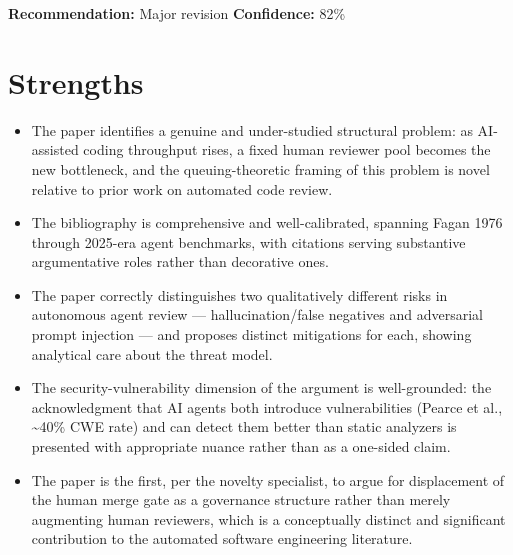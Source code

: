 \documentclass[11pt]{article}
\begin{document}
\textbf{Recommendation:} Major revision \quad \textbf{Confidence:} 82\%\\

\section*{Strengths}
\begin{itemize}[leftmargin=*]
  \item The paper identifies a genuine and under-studied structural problem: as AI-assisted coding throughput rises, a fixed human reviewer pool becomes the new bottleneck, and the queuing-theoretic framing of this problem is novel relative to prior work on automated code review.
  \item The bibliography is comprehensive and well-calibrated, spanning Fagan 1976 through 2025-era agent benchmarks, with citations serving substantive argumentative roles rather than decorative ones.
  \item The paper correctly distinguishes two qualitatively different risks in autonomous agent review --- hallucination/false negatives and adversarial prompt injection --- and proposes distinct mitigations for each, showing analytical care about the threat model.
  \item The security-vulnerability dimension of the argument is well-grounded: the acknowledgment that AI agents both introduce vulnerabilities (Pearce et al., \~{}40\% CWE rate) and can detect them better than static analyzers is presented with appropriate nuance rather than as a one-sided claim.
  \item The paper is the first, per the novelty specialist, to argue for displacement of the human merge gate as a governance structure rather than merely augmenting human reviewers, which is a conceptually distinct and significant contribution to the automated software engineering literature.
\end{itemize}
\end{document}
